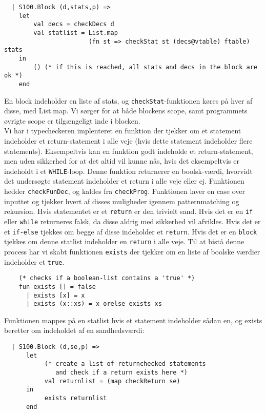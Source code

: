 \documentclass[12pt]{article}
\begin{document}
\begin{verbatim}
  | S100.Block (d,stats,p) =>
    let
        val decs = checkDecs d
        val statlist = List.map
                       (fn st => checkStat st (decs@vtable) ftable) stats
    in
        () (* if this is reached, all stats and decs in the block are ok *)
    end
\end{verbatim}

En block indeholder en liste af stats, og \texttt{checkStat}-funktionen køres på hver af disse, med List.map. Vi sørger for at både blockens scope, samt programmets øvrigte scope er tilgængeligt inde i blocken.\\

Vi har i typecheckeren implenteret en funktion der tjekker om et statement indeholder et return-statement i alle veje (hvis dette statement indeholder flere statements). Eksempeltvis kan en funktion godt indeholde et return-statement, men uden sikkerhed for at det altid vil kunne nås, hvis det eksempeltvis er indeholdt i et \texttt{WHILE}-loop. Denne funktion returnerer en boolsk-værdi, hvorvidt det undersøgte statement  indeholder et return i alle veje eller ej. Funktionen hedder \texttt{checkFunDec}, og kaldes fra \texttt{checkProg}. Funktionen laver en case over inputtet og tjekker hvert af disses muligheder igennem patternmatching og rekursion. Hvis statementet er et \texttt{return} er den trivielt sand. Hvis det er en \texttt{if} eller \texttt{while} returneres falsk, da disse aldrig med sikkerhed vil afvikles. Hvis det er et \texttt{if-else} tjekkes om begge af disse indeholder et \texttt{return}. Hvis det er en \texttt{block} tjekkes om denne statlist indeholder en \texttt{return} i alle veje. Til at bistå denne process har vi skabt funktionen \texttt{exists} der tjekker om en liste af boolske værdier indeholder et \texttt{true}.

\begin{verbatim}
    (* checks if a boolean-list contains a 'true' *)
    fun exists [] = false
      | exists [x] = x
      | exists (x::xs) = x orelse exists xs
\end{verbatim}

Funktionen mappes på en statlist hvis et statement indeholder sådan en, og exists beretter om indeholdet af en sandhedsværdi:\\

\begin{verbatim}
  | S100.Block (d,se,p) =>
      let
           (* create a list of returnchecked statements
              and check if a return exists here *)
           val returnlist = (map checkReturn se)
      in
           exists returnlist
      end
\end{verbatim}
\end{document}

